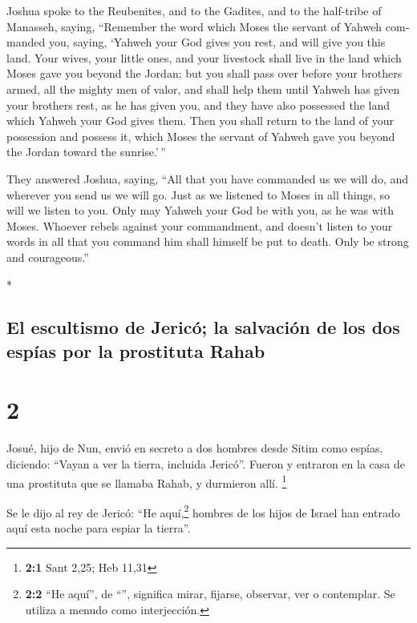 \begin{paracol}{2}
\begin{otherlanguage}{english}
 Joshua spoke to the Reubenites, and to the Gadites, and
to the half-tribe of Manasseh, saying,  ``Remember the
word which Moses the servant of Yahweh commanded you, saying, `Yahweh
your God gives you rest, and will give you this land. 
Your wives, your little ones, and your livestock shall live in the land
which Moses gave you beyond the Jordan; but you shall pass over before
your brothers armed, all the mighty men of valor, and shall help them
 until Yahweh has given your brothers rest, as he has
given you, and they have also possessed the land which Yahweh your God
gives them. Then you shall return to the land of your possession and
possess it, which Moses the servant of Yahweh gave you beyond the Jordan
toward the sunrise.'\,''

 They answered Joshua, saying, ``All that you have
commanded us we will do, and wherever you send us we will go.
 Just as we listened to Moses in all things, so will we
listen to you. Only may Yahweh your God be with you, as he was with
Moses.  Whoever rebels against your commandment, and
doesn't listen to your words in all that you command him shall himself
be put to death. Only be strong and courageous.''

\end{otherlanguage}

\switchcolumn[0]*

\hypertarget{el-escultismo-de-jericuxf3-la-salvaciuxf3n-de-los-dos-espuxedas-por-la-prostituta-rahab}{%
\subsection{El escultismo de Jericó; la salvación de los dos espías por
la prostituta
Rahab}\label{el-escultismo-de-jericuxf3-la-salvaciuxf3n-de-los-dos-espuxedas-por-la-prostituta-rahab}}

\hypertarget{section-2}{%
\section{2}\label{section-2}}

 Josué, hijo de Nun, envió en secreto a dos hombres desde
Sitim como espías, diciendo: ``Vayan a ver la tierra, incluida Jericó''.
Fueron y entraron en la casa de una prostituta que se llamaba Rahab, y
durmieron allí. \footnote{\textbf{2:1} Sant 2,25; Heb 11,31}

 Se le dijo al rey de Jericó: ``He aquí,\footnote{\textbf{2:2}
  ``He aquí'', de ``'', significa mirar, fijarse, observar,
  ver o contemplar. Se utiliza a menudo como interjección.} hombres de
los hijos de Israel han entrado aquí esta noche para espiar la tierra''.


\end{paracol}
